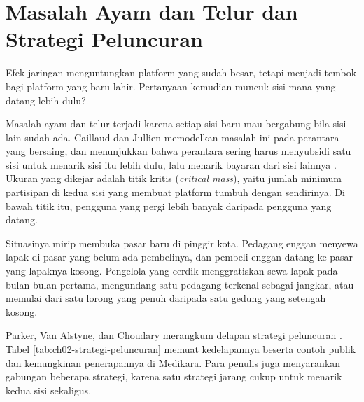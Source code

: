 \section{Masalah Ayam dan Telur dan Strategi Peluncuran}

Efek jaringan menguntungkan platform yang sudah besar, tetapi menjadi tembok
bagi platform yang baru lahir. Pertanyaan kemudian muncul: sisi mana yang
datang lebih dulu?

Masalah ayam dan telur terjadi karena setiap sisi baru mau bergabung bila sisi
lain sudah ada. Caillaud dan Jullien memodelkan masalah ini pada perantara yang
bersaing, dan menunjukkan bahwa perantara sering harus menyubsidi satu sisi
untuk menarik sisi itu lebih dulu, lalu menarik bayaran dari sisi lainnya
\cite{c02-caillaud2003chicken}. Ukuran yang dikejar adalah titik kritis
(\textit{critical mass}), yaitu jumlah minimum partisipan di kedua sisi yang
membuat platform tumbuh dengan sendirinya. Di bawah titik itu, pengguna yang
pergi lebih banyak daripada pengguna yang datang.

Situasinya mirip membuka pasar baru di pinggir kota. Pedagang enggan menyewa
lapak di pasar yang belum ada pembelinya, dan pembeli enggan datang ke pasar
yang lapaknya kosong. Pengelola yang cerdik menggratiskan sewa lapak pada
bulan-bulan pertama, mengundang satu pedagang terkenal sebagai jangkar, atau
memulai dari satu lorong yang penuh daripada satu gedung yang setengah kosong.

Parker, Van Alstyne, dan Choudary merangkum delapan strategi peluncuran
\cite{parker2016platform, c02-choudary2016launch}. Tabel
\ref{tab:ch02-strategi-peluncuran} memuat kedelapannya beserta contoh publik
dan kemungkinan penerapannya di Medikara. Para penulis juga menyarankan
gabungan beberapa strategi, karena satu strategi jarang cukup untuk menarik
kedua sisi sekaligus.


